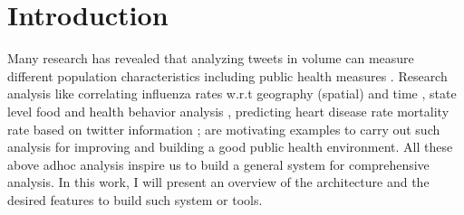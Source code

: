 \section*{Introduction}
\label{sec:intro}
Many research has revealed that analyzing tweets in volume can measure different population characteristics including public
health measures \cite{paul2011you, paul2012model, eichstaedt2015psychological, barros2018disease, mueller2018crowdbreaks, karami2018characterizing}.
Research analysis like correlating influenza rates w.r.t geography (spatial) and time \cite{signorini2011use}, state level food and health behavior analysis \cite{nguyen2017social}, predicting heart disease rate mortality rate based on twitter information \cite{eichstaedt2015psychological}; are motivating examples to carry out such analysis for improving and building a good public health environment.
All these above adhoc analysis inspire us to build a general system for comprehensive analysis.
In this work, I will present an overview of the architecture and the desired features to build such system or tools.




